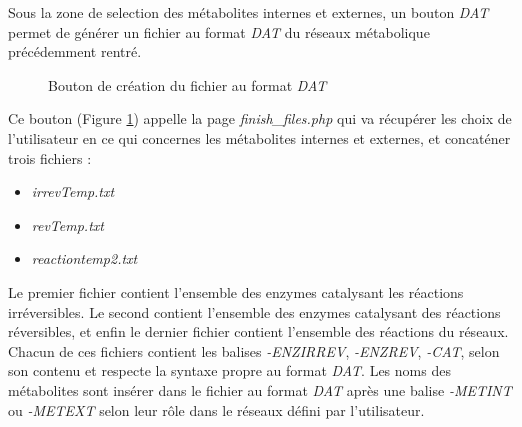 Sous la zone de selection des métabolites internes et externes, un bouton \emph{DAT} permet de générer un fichier au format \emph{DAT} du réseaux métabolique précédemment rentré. \\

\begin{figure}[!ht]
    \begin{center}
        \caption{Bouton de création du fichier au format \emph{DAT}}
          \label{boutonDAT}
      \end{center}   
\end{figure}

Ce bouton (Figure \ref{boutonDAT}) appelle la page \emph{finish\_files.php} qui va  récupérer les choix de l'utilisateur en ce qui concernes les métabolites internes et externes, et concaténer trois fichiers :
\begin{itemize}
\item \emph{irrevTemp.txt}
\item \emph{revTemp.txt}
\item \emph{reactiontemp2.txt}
\end{itemize}

Le premier fichier contient l'ensemble des enzymes catalysant les réactions irréversibles. Le second contient l'ensemble des enzymes catalysant des réactions réversibles, et enfin le dernier fichier contient l'ensemble des réactions du réseaux. \\
Chacun de ces fichiers contient les balises \emph{-ENZIRREV}, \emph{-ENZREV}, \emph{-CAT}, selon son contenu et respecte la syntaxe propre au format \emph{DAT}.
Les noms des métabolites sont insérer dans le fichier au format \emph{DAT} après une balise \emph{-METINT} ou \emph{-METEXT} selon leur rôle dans le réseaux défini par l'utilisateur.

